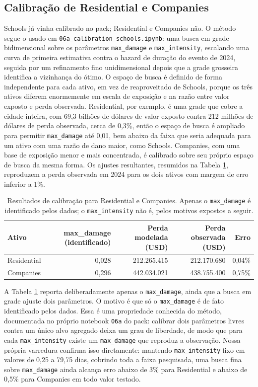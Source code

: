 \documentclass[11pt]{article}
\begin{document}
\subsection{Calibração de Residential e Companies}
\label{sec:calibration}

Schools já vinha calibrado no pack; Residential e Companies não. O método segue o usado em
\texttt{06a\_calibration\_schools.ipynb}: uma busca em grade bidimensional sobre os
parâmetros \texttt{max\_damage} e \texttt{max\_intensity}, escalando uma curva de primeira
estimativa contra o hazard de duração do evento de 2024, seguida por um refinamento fino
unidimensional depois que a grade grosseira identifica a vizinhança do ótimo. O espaço de
busca é definido de forma independente para cada ativo, em vez de reaproveitado de Schools,
porque os três ativos diferem enormemente em escala de exposição e na razão entre valor
exposto e perda observada. Residential, por exemplo, é uma grade que cobre a cidade
inteira, com 69,3 bilhões de dólares de valor exposto contra 212 milhões de dólares de
perda observada, cerca de 0,3\%, então o espaço de busca é ampliado para permitir
\texttt{max\_damage} até 0,01, bem abaixo da faixa que seria adequada para um ativo com uma
razão de dano maior, como Schools. Companies, com uma base de exposição menor e mais
concentrada, é calibrado sobre seu próprio espaço de busca da mesma forma. Os ajustes
resultantes, resumidos na Tabela \ref{tab:calibracao}, reproduzem a perda observada em 2024
para os dois ativos com margem de erro inferior a 1\%.

\begin{table}[H]
\centering
\caption{Resultados de calibração para Residential e Companies. Apenas o
\texttt{max\_damage} é identificado pelos dados; o \texttt{max\_intensity} não é, pelos
motivos expostos a seguir.}
\label{tab:calibracao}
\footnotesize
\begin{tabular}{lrrrr}
\toprule
Ativo & max\_damage (identificado) & Perda modelada (USD) & Perda observada (USD) & Erro \\
\midrule
Residential & 0,028 & 212.265.415 & 212.170.680 & 0,04\% \\
Companies & 0,296 & 442.034.021 & 438.755.400 & 0,75\% \\
\bottomrule
\end{tabular}
\end{table}

A Tabela \ref{tab:calibracao} reporta deliberadamente apenas o \texttt{max\_damage}, ainda
que a busca em grade ajuste dois parâmetros. O motivo é que só o \texttt{max\_damage} é de
fato identificado pelos dados. Essa é uma propriedade conhecida do método, documentada no
próprio notebook \texttt{06a} do pack: calibrar dois parâmetros livres contra um único alvo
agregado deixa um grau de liberdade, de modo que para cada \texttt{max\_intensity} existe
um \texttt{max\_damage} que reproduz a observação. Nossa própria varredura confirma isso
diretamente: mantendo \texttt{max\_intensity} fixo em valores de 0,25 a 79,75 dias,
cobrindo toda a faixa pesquisada, uma busca fina sobre \texttt{max\_damage} ainda alcança
erro abaixo de 3\% para Residential e abaixo de 0,5\% para Companies em todo valor testado.
\end{document}
